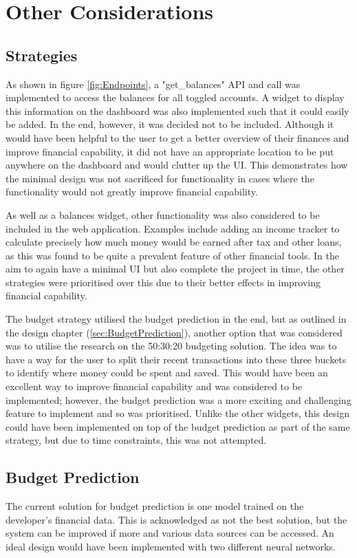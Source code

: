 \section{Other Considerations}

\subsection{Strategies}
As shown in figure \ref{fig:Endpoints}, a "get\_balances" API and call was implemented to access the balances for all toggled accounts. A widget to display this information on the dashboard was also implemented such that it could easily be added. In the end, however, it was decided not to be included. Although it would have been helpful to the user to get a better overview of their finances and improve financial capability, it did not have an appropriate location to be put anywhere on the dashboard and would clutter up the UI. This demonstrates how the minimal design was not sacrificed for functionality in cases where the functionality would not greatly improve financial capability.

As well as a balances widget, other functionality was also considered to be included in the web application. Examples include adding an income tracker to calculate precisely how much money would be earned after tax and other loans, as this was found to be quite a prevalent feature of other financial tools. In the aim to again have a minimal UI but also complete the project in time, the other strategies were prioritised over this due to their better effects in improving financial capability.

The budget strategy utilised the budget prediction in the end, but as outlined in the design chapter (\ref{sec:BudgetPrediction}), another option that was considered was to utilise the research on the 50:30:20 budgeting solution. The idea was to have a way for the user to split their recent transactions into these three buckets to identify where money could be spent and saved. This would have been an excellent way to improve financial capability and was considered to be implemented; however, the budget prediction was a more exciting and challenging feature to implement and so was prioritised. Unlike the other widgets, this design could have been implemented on top of the budget prediction as part of the same strategy, but due to time constraints, this was not attempted.

\subsection{Budget Prediction}
The current solution for budget prediction is one model trained on the developer's financial data. This is acknowledged as not the best solution, but the system can be improved if more and various data sources can be accessed. An ideal design would have been implemented with two different neural networks.

